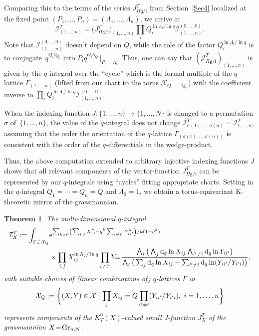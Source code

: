 \documentclass[pdftex]{sigma}
\numberwithin{equation}{section}
\newtheorem{Theorem}{Theorem}[section]
\def\I{\mathcal I}
\def\J{\mathcal J}
\def\X{\mathcal X}
\def\p{\partial}
\begin{document}
Comparing this to the terms of the series $J^T_{\Pi\mathfrak{g}/\mathfrak{t}}$ from Section~\ref{Sec4} localized at the fixed point $(P_1,\dots,P_n)=(\Lambda_1,\dots,\Lambda_n)$, we arrive at
\[
\I^T_{(1,\dots,n)}=\big(J^T_{\Pi\mathfrak{g}/\mathfrak{t}}\big)_{(1,\dots,n)} \prod_i Q_i^{\ln \Lambda_i/\ln q} \I^{(0,\dots,0)}_{(1,\dots,n)}.
\]
Note that $\I^{(0,\dots,0)}_{(1,\dots,n)}$ doesn't depend on $Q$, while the role of the factor $Q_i^{\ln \Lambda_i/\ln q}$ is to conjugate~$q^{Q_i\p_{Q_i}}$ into $P_i q^{Q_i\p_{Q_i}}|_{P_i=\Lambda_i}$. Thus, one can say that $(\J^T_{\Pi\mathfrak{g}/\mathfrak{t}})_{(1,\dots,n)}$ is given by the $q$-integral
over the ``cycle'' which is the formal multiple of the $q$-lattice $\Gamma_{(1,\dots,n)}$ (lifted from our chart to the torus $\X_{Q_1,\dots,Q_n}$) with the coefficient inverse to
$\prod_i Q_i^{\ln \Lambda_i/\ln q} \I^{(0,\dots,0)}_{(1,\dots,n)}$.

When the indexing function $J\colon\{1,\dots,n\}\to \{1,\dots,N\}$ is changed to
a permutation $\sigma$ of~$\{ 1,\dots, n\}$, the value of the $q$-integral does not change
$\I^T_{\sigma(1),\dots,\sigma(n)}=\I^T_{1,\dots,n}$, assuming that the order the orientation
of the $q$-lattice $\Gamma_{(\sigma(1),\dots,\sigma(n))}$ is consistent with the order of the
$q$-differentials in the wedge-product.

Thus, the above computation extended to arbitrary injective indexing functions $J$ shows that all relevant components of the vector-function $J^T_{\Pi \mathfrak{g}/\mathfrak{t}}$ can be represented by our $q$-integrals using ``cycles'' fitting appropriate charts.
Setting in the $q$-integral $Q_1=\cdots=Q_n=Q$ and $\Lambda_0=1$, we obtain a torus-equivariant K-theoretic mirror of the grassmannian.

\begin{Theorem}\label{thm7}
The multi-dimensional $q$-integral
\begin{align*}
\I_X^T :=\int_{\Gamma\subset \X_{Q}} &{\rm e}^{ \sum_{k>0}\left(\sum_{i,j}X_{ij}^k - q^k \sum_{i\neq i'}Y_{ii'}^k\right)/k(1-q^k)} \\
&\times \prod_{i,j}X_{ij}^{\ln \Lambda_j/\ln q} \prod_{i\neq i'} Y_{ii'} \frac{\bigwedge_i \big(\bigwedge_j {\rm d}_q\ln X_{ij} \bigwedge_{i'\neq i}{\rm d}_q \ln Y_{ii'}\big)}{\bigwedge_i \big( \sum_j{\rm d}_q\ln X_{ij} -\sum_{i'\neq i}{\rm d}_q\ln (Y_{ii'}/Y_{i'i})\big)},
\end{align*}
with suitable choices of (linear combinations of) $q$-lattices $\Gamma$ in
\[
\X_{Q}:=\bigg\{ (X,Y)\in \X \bigm| \prod_jX_{ij}=Q \prod_{i'\neq i}(Y_{ii'}/Y_{i'i}),\
i=1,\dots, n \bigg\}
\]
represents components of the $K^0_T(X)$-valued small J-function $J^T_X$ of the grassmannian \mbox{$X\!=\!{\rm Gr}_{n,N}$}.
\end{Theorem}
\end{document}
